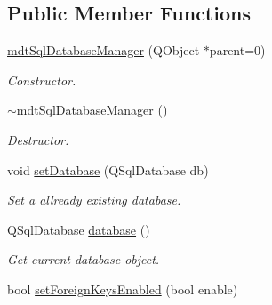 \subsection*{Public Member Functions}
\begin{DoxyCompactItemize}
\item 
\hypertarget{classmdt_sql_database_manager_a8a9b487981f99ddc5d476776e5e0bb06}{
\hyperlink{classmdt_sql_database_manager_a8a9b487981f99ddc5d476776e5e0bb06}{mdtSqlDatabaseManager} (QObject $\ast$parent=0)}
\label{classmdt_sql_database_manager_a8a9b487981f99ddc5d476776e5e0bb06}

\begin{DoxyCompactList}\small\item\em Constructor. \end{DoxyCompactList}\item 
\hypertarget{classmdt_sql_database_manager_affd97fb8d28d07617e860d748ff57c5f}{
\hyperlink{classmdt_sql_database_manager_affd97fb8d28d07617e860d748ff57c5f}{$\sim$mdtSqlDatabaseManager} ()}
\label{classmdt_sql_database_manager_affd97fb8d28d07617e860d748ff57c5f}

\begin{DoxyCompactList}\small\item\em Destructor. \end{DoxyCompactList}\item 
\hypertarget{classmdt_sql_database_manager_a6c6f2b1a7754193e3a9b80069c8df747}{
void \hyperlink{classmdt_sql_database_manager_a6c6f2b1a7754193e3a9b80069c8df747}{setDatabase} (QSqlDatabase db)}
\label{classmdt_sql_database_manager_a6c6f2b1a7754193e3a9b80069c8df747}

\begin{DoxyCompactList}\small\item\em Set a allready existing database. \end{DoxyCompactList}\item 
\hypertarget{classmdt_sql_database_manager_a54755f29b7cd87746e34a107e60241c5}{
QSqlDatabase \hyperlink{classmdt_sql_database_manager_a54755f29b7cd87746e34a107e60241c5}{database} ()}
\label{classmdt_sql_database_manager_a54755f29b7cd87746e34a107e60241c5}

\begin{DoxyCompactList}\small\item\em Get current database object. \end{DoxyCompactList}\item 
\hypertarget{classmdt_sql_database_manager_a40638df04f9e6eb3c5cee399a5543ffd}{
bool \hyperlink{classmdt_sql_database_manager_a40638df04f9e6eb3c5cee399a5543ffd}{setForeignKeysEnabled} (bool enable)}
\label{classmdt_sql_database_manager_a40638df04f9e6eb3c5cee399a5543ffd}


\end{DoxyCompactItemize}
